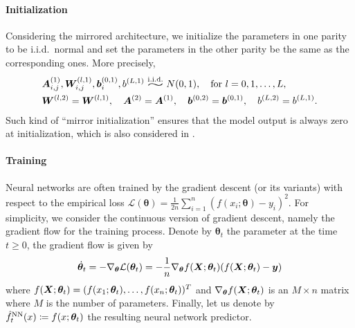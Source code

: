 %  





\paragraph{Initialization}
Considering the mirrored architecture, we initialize the parameters in one parity to be i.i.d.\ normal and set the parameters in the other parity be the same as the corresponding ones.
More precisely,
\begin{align*}
  \begin{aligned}
    &\bm{A}^{(1)}_{i,j},\bm{W}^{(l,1)}_{i,j},\bm{b}^{(0,1)}_i,b^{(L,1)} \iid N(0,1),\quad \text{for}~l=0,1,\dots,L, \\
    & \bm{W}^{(l,2)} = \bm{W}^{(l,1)},\quad\bm{A}^{(2)}=\bm{A}^{(1)},\quad\bm{b}^{(0,2)} = \bm{b}^{(0,1)}, \quad b^{(L,2)} = b^{(L,1)}.
  \end{aligned}
\end{align*}
Such kind of ``mirror initialization'' ensures that the model output is always zero at initialization,
which is also considered in \citet{lai2023_GeneralizationAbility}.

\paragraph{Training}
Neural networks are often trained by the gradient descent (or its variants) with respect to the empirical loss
$\mathcal{L}(\bm{\theta}) = \frac{1}{2n}\sum_{i=1}^n (f(x_i;\bm{\theta}) - y_i)^2$.
For simplicity, we consider the continuous version of gradient descent, namely the gradient flow for the training process.
Denote by $\bm{\theta}_t$ the parameter at the time $t \geq 0$, the gradient flow is given by
\begin{align}
  \label{eq:2_GD}
  \dot{\bm{\theta}}_t = - \nabla_{\bm{\theta}} \mathcal{L}(\bm{\theta}_t)= - \frac{1}{n} \nabla_{\bm{\theta}} f(\bm{X};\bm{\theta}_t) (f(\bm{X};\bm{\theta}_t) - \bm{y})
\end{align}
where $f(\bm{X};\bm{\theta}_t) = (f(x_1;\bm{\theta}_t),\dots,f(x_n;\bm{\theta}_t))^T$ and $\nabla_{\bm{\theta}} f(\bm{X};\bm{\theta}_t)$ is an $M \times n$
matrix where $M$ is the number of parameters.
Finally, let us denote by $\hat{f}^{\mathrm{NN}}_t(x) \coloneqq f(x;\bm{\theta}_t)$
the resulting neural network predictor.

